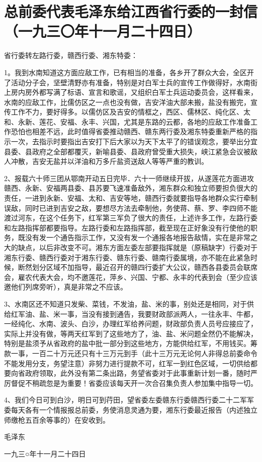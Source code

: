 \section[总前委代表毛泽东给江西省行委的一封信（一九三〇年十一月二十四日）]{总前委代表毛泽东给江西省行委的一封信（一九三〇年十一月二十四日）}


省行委转左路行委，赣西行委、湘东特委：

1。我到水南知道这方面应敌工作，已有相当的准备，各乡开了群众大会，全区开了活动分子会，坚壁清野亦有准备，特别是对白军士兵的宣传工作做得好，水南街上房内房外都写满了标语、宣言和歌谣，又组织白军士兵运动委员会，这样看来，水南的应敌工作，比儒仿区之一点也没有做，吉安洋油大部未搬，盐没有搬完，宣传工作不力，要好得多。以儒仿区及吉安的情框之，西区、儒林区、纯化区、太和、永新、莲花、安福、永丰、兴国，尤其是东路的云都，各地的应敌工作准备工作恐怕也相差不远，此时值得省委推动赣西、赣东两行委及湘东特委重新严格的指示一次，去指示时要指出吉安打下后大家以为天下太平了的错误观念，要举出分宜县委、县政府之全部都覆灭，新喻县委、县政府曾受重大损失，峡江紧急会议被敌人冲散，吉安无盐并以洋油和万多斤盐资送敌人等等严重的教训。

2、报载六十师三团从鄂南开动五日完毕．六十一师继续开拔，从遂莲花方面进攻赣西、永新、安福两县委、县苏要飞速准备敌外，湘东群众和独立师要担负很大的责任，一进到永新、安福、太和、吉安等地，赣西行委就要指导各地群众实行牵制误敌，同时已进到吉安之敌，要想尽方法去牵制他，务使蒋、蔡、罗、李四师不能渡过河东，在这个任务下，红军第三军负了很大的责任，上述许多工作，左路行委和左路指挥部都要指导。左路行委和左路指挥部，截至现在正好象没有行使他的职务，既没有发一个通告指示工作，又没有发一个通报各地报告敌情，实在是非常之大的缺点，以后非改变不可。湘东方面左委左部要指挥就是（原稿缺字）行委对于湘东行委、赣西行委对于湘东行委、赣东行委、赣南行委属境，亦不能在此紧急时候，断然划分区域不加指导，最近召开的赣四行委扩大公议，赣西各县委员会联席会，雇农代表大会，均不邀莲花，萍乡、兴国、宁都、永丰的代表到会（至少应该邀他们列席旁听），真是非常之不应该。

3、水南区还不知道只发柴、菜钱，不发油，盐、米的事，别处还是相同，对于供给红军油、盐、米一事，当没有接到通告，我要财政部派两人，一往永丰、牛都，一经纯化、水南、波头、白沙，办理红军给养问题，财政部负责人员号应接应了，实际上并没有做，等两天红军到了这些地方了，油、盐、米问题全然仍不能解决，特别是盐须予从省政府的盐中批一部分到这些地方，方能供给红军，不用钱买。筹款一事，一百二十万元还只有十三万元到手（此十三万元无论何人非得总前委命令不能发用分支，务望注意）非努力进行提款不可，红军一到红色区域，一切供给都要向省政府领取，此外没有第二条出路，务望省委对于此事重新计划一番，随时严厉督促不稍疏忽是为重要！省委应该每天开一次合召集负责人参加集中指导一切。

4、我们今日可到白沙，明日可到荇田，望省委左委赣东行委赣西行委二十二军军委每天各有一个情报报总前委，务使消息灵通为要，湘东行委最近报告（内述独立师缴枪五百余等事的）在安收到。

 毛泽东

 一九三○年十一月二十四日

